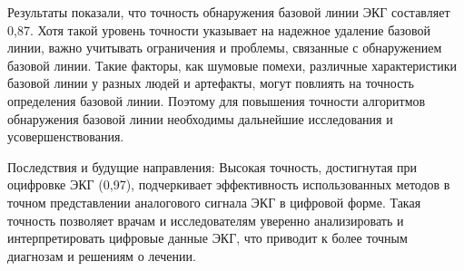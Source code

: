 Результаты показали, что точность обнаружения базовой линии ЭКГ составляет 0,87. Хотя такой уровень точности указывает на надежное удаление базовой линии, важно учитывать ограничения и проблемы, связанные с обнаружением базовой линии. Такие факторы, как шумовые помехи, различные характеристики базовой линии у разных людей и артефакты, могут повлиять на точность определения базовой линии. Поэтому для повышения точности алгоритмов обнаружения базовой линии необходимы дальнейшие исследования и усовершенствования.

Последствия и будущие направления:
Высокая точность, достигнутая при оцифровке ЭКГ (0,97), подчеркивает эффективность использованных методов в точном представлении аналогового сигнала ЭКГ в цифровой форме. Такая точность позволяет врачам и исследователям уверенно анализировать и интерпретировать цифровые данные ЭКГ, что приводит к более точным диагнозам и решениям о лечении.



